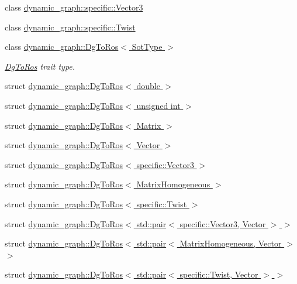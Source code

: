 \begin{DoxyCompactItemize}
\item 
class \hyperlink{classdynamic__graph_1_1specific_1_1Vector3}{dynamic\+\_\+graph\+::specific\+::\+Vector3}
\item 
class \hyperlink{classdynamic__graph_1_1specific_1_1Twist}{dynamic\+\_\+graph\+::specific\+::\+Twist}
\item 
class \hyperlink{classdynamic__graph_1_1DgToRos}{dynamic\+\_\+graph\+::\+Dg\+To\+Ros$<$ Sot\+Type $>$}
\begin{DoxyCompactList}\small\item\em \hyperlink{classdynamic__graph_1_1DgToRos}{Dg\+To\+Ros} trait type. \end{DoxyCompactList}\item 
struct \hyperlink{structdynamic__graph_1_1DgToRos_3_01double_01_4}{dynamic\+\_\+graph\+::\+Dg\+To\+Ros$<$ double $>$}
\item 
struct \hyperlink{structdynamic__graph_1_1DgToRos_3_01unsigned_01int_01_4}{dynamic\+\_\+graph\+::\+Dg\+To\+Ros$<$ unsigned int $>$}
\item 
struct \hyperlink{structdynamic__graph_1_1DgToRos_3_01Matrix_01_4}{dynamic\+\_\+graph\+::\+Dg\+To\+Ros$<$ Matrix $>$}
\item 
struct \hyperlink{structdynamic__graph_1_1DgToRos_3_01Vector_01_4}{dynamic\+\_\+graph\+::\+Dg\+To\+Ros$<$ Vector $>$}
\item 
struct \hyperlink{structdynamic__graph_1_1DgToRos_3_01specific_1_1Vector3_01_4}{dynamic\+\_\+graph\+::\+Dg\+To\+Ros$<$ specific\+::\+Vector3 $>$}
\item 
struct \hyperlink{structdynamic__graph_1_1DgToRos_3_01MatrixHomogeneous_01_4}{dynamic\+\_\+graph\+::\+Dg\+To\+Ros$<$ Matrix\+Homogeneous $>$}
\item 
struct \hyperlink{structdynamic__graph_1_1DgToRos_3_01specific_1_1Twist_01_4}{dynamic\+\_\+graph\+::\+Dg\+To\+Ros$<$ specific\+::\+Twist $>$}
\item 
struct \hyperlink{structdynamic__graph_1_1DgToRos_3_01std_1_1pair_3_01specific_1_1Vector3_00_01Vector_01_4_01_4}{dynamic\+\_\+graph\+::\+Dg\+To\+Ros$<$ std\+::pair$<$ specific\+::\+Vector3, Vector $>$ $>$}
\item 
struct \hyperlink{structdynamic__graph_1_1DgToRos_3_01std_1_1pair_3_01MatrixHomogeneous_00_01Vector_01_4_01_4}{dynamic\+\_\+graph\+::\+Dg\+To\+Ros$<$ std\+::pair$<$ Matrix\+Homogeneous, Vector $>$ $>$}
\item 
struct \hyperlink{structdynamic__graph_1_1DgToRos_3_01std_1_1pair_3_01specific_1_1Twist_00_01Vector_01_4_01_4}{dynamic\+\_\+graph\+::\+Dg\+To\+Ros$<$ std\+::pair$<$ specific\+::\+Twist, Vector $>$ $>$}
\end{DoxyCompactItemize}

